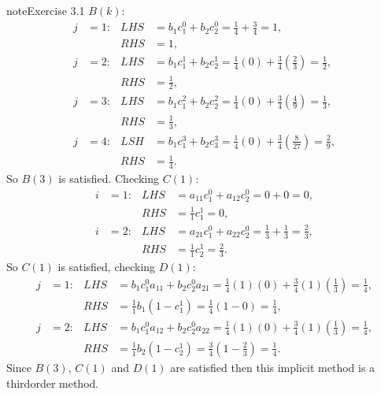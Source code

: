 \documentclass[letterpaper,10pt,english]{jupyterBook}
\begin{document}
\begin{sphinxadmonition}{note}{Exercise 3.1}
\sphinxAtStartPar
\(B(k)\):
\begin{align*}
    j &= 1: & LHS &= b_1 c_1^0 + b_2 c_2^0 = \tfrac{1}{4} + \tfrac{3}{4} = 1, \\
    && RHS &= 1, \\
    j &= 2: & LHS &= b_1 c_1^1 + b_2 c_2^1 = \tfrac{1}{4}(0) + \tfrac{3}{4} ( \tfrac{2}{3} ) = \tfrac{1}{2}, \\
    && RHS &= \tfrac{1}{2}, \\
    j &= 3: & LHS &= b_1 c_1^2 + b_2 c_2^2 = \tfrac{1}{4}(0) + \tfrac{3}{4} ( \tfrac{4}{9} ) = \tfrac{1}{3}, \\
    && RHS &= \tfrac{1}{3}, \\
    j &= 4: & LSH &= b_1 c_1^3 + b_2 c_3^3 = \tfrac{1}{4}(0) + \tfrac{3}{4} ( \tfrac{8}{27} ) = \tfrac{2}{9}, \\
    && RHS &= \tfrac{1}{4}.
\end{align*}
\sphinxAtStartPar
So \(B(3)\) is satisfied. Checking \(C(1)\):
\begin{align*}
    i &= 1: & LHS &= a_{11} c_1^0 + a_{12} c_2^0 = 0 + 0 = 0, \\
    && RHS &= \tfrac{1}{1} c_1^1 = 0, \\
    i &= 2: & LHS &= a_{21} c_1^0 + a_{22} c_2^0 = \tfrac{1}{3} + \tfrac{1}{3} = \tfrac{2}{3}, \\
    && RHS &= \tfrac{1}{1} c_2^1 = \tfrac{2}{3}.
\end{align*}
\sphinxAtStartPar
So \(C(1)\) is satisfied, checking \(D(1)\):
\begin{align*}
    j &= 1: & LHS &= b_1 c_1^0 a_{11} + b_2 c_2^0 a_{21} = \tfrac{1}{4} (1)(0) + \tfrac{3}{4} (1) ( \tfrac{1}{3} ) = \tfrac{1}{4}, \\
    && RHS &= \tfrac{1}{1}b_1(1 - c_1^1) = \tfrac{1}{4}(1 - 0) = \tfrac{1}{4}, \\
    j &= 2: & LHS &= b_1 c_1^0 a_{12} + b_2 c_2^0 a_{22} = \tfrac{1}{4} (1)(0) + \tfrac{3}{4} (1) ( \tfrac{1}{3} ) = \tfrac{1}{4}, \\
    && RHS &= \tfrac{1}{1} b_2 (1 - c_2^1) = \tfrac{3}{4} ( 1 - \tfrac{2}{3} ) = \tfrac{1}{4}.
\end{align*}
\sphinxAtStartPar
Since \(B(3)\), \(C(1)\) and \(D(1)\) are satisfied then this implicit method is a third\sphinxhyphen{}order method.
\end{sphinxadmonition}
\end{document}
